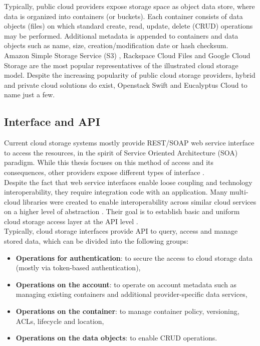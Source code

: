 Typically, public cloud providers expose storage space as object data store,
where data is organized into containers (or buckets). Each container consists
of data objects (files) on which standard create, read, update, delete (CRUD)
operations may be performed. Additional metadata is appended to containers and
data objects such as name, size, creation/modification date or hash checksum.\\

Amazon Simple Storage Service (S3) \cite{amazon-s3}, 
Rackspace Cloud Files \cite{rackspace-cloud} and
Google Cloud Storage \cite{google-cloud} are the most popular representatives
of the illustrated cloud storage model. Despite the increasing popularity of
public cloud storage providers, hybrid and private cloud solutions do exist,
Openstack Swift \cite{openstack-cloud} and 
Eucalyptus Cloud \cite{eucalyptus-cloud} to name just a few.\\

		\subsection{Interface and API}
Current cloud storage systems mostly provide REST/SOAP web service interface to
access the resources, in the spirit of Service Oriented Architecture (SOA)
paradigm. While this thesis focuses on this method of access and its
consequences, other providers expose different types of interface
\cite{cloud-storage-anatomy}.\\

Despite the fact that web service interfaces enable loose coupling and
technology interoperability, they require integration code with an application.
Many multi-cloud libraries were created to enable interoperability across
similar cloud services on a higher level of abstraction 
\cite{cloud-federation}. Their goal is to establish basic and uniform cloud
storage access layer at the API level \cite{jclouds, libcloud}.\\

Typically, cloud storage interfaces provide API to query, access and manage
stored data, which can be divided into the following groups:\\

\begin{itemize}
	\item \textbf{Operations for authentication}: to secure the access to
	cloud storage data (mostly via token-based authentication),  
	\item \textbf{Operations on the account}: to operate on account metadata
	such as managing existing containers and additional provider-specific data
	services,
	\item \textbf{Operations on the container}: to manage container policy, 
	versioning, ACLs, lifecycle and location,
	\item \textbf{Operations on the data objects}: to enable CRUD operations.
\end{itemize} 

